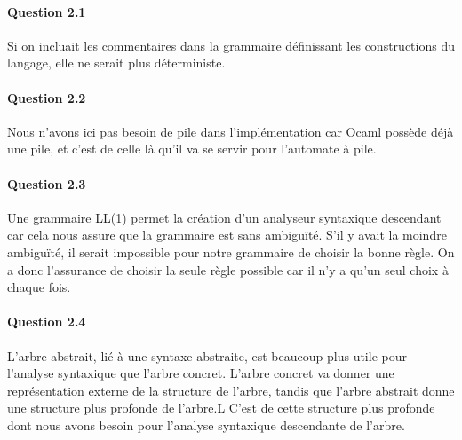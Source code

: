 \documentclass[11pt]{article} %
\begin{document}
\paragraph{Question 2.1} Si on incluait les commentaires dans la grammaire définissant les constructions du langage, elle ne serait plus déterministe.
\paragraph{Question 2.2} Nous n'avons ici pas besoin de pile dans l'implémentation car Ocaml possède déjà une pile, et c'est de celle là qu'il va se servir pour l'automate à pile.
\paragraph{Question 2.3} Une grammaire LL(1) permet la création d'un analyseur syntaxique descendant car cela nous assure que la grammaire est sans ambiguïté. S'il y avait la moindre ambiguïté, il serait impossible pour notre grammaire de choisir la bonne règle. On a donc l'assurance de choisir la seule règle possible car il n'y a qu'un seul choix à chaque fois.
\paragraph{Question 2.4} L'arbre abstrait, lié à une syntaxe abstraite, est beaucoup plus utile pour l'analyse syntaxique que l'arbre concret. L'arbre concret va donner une représentation externe de la structure de l'arbre, tandis que l'arbre abstrait donne une structure plus profonde de l'arbre.L C'est de cette structure plus profonde dont nous avons besoin pour l'analyse syntaxique descendante de l'arbre.
\end{document}
